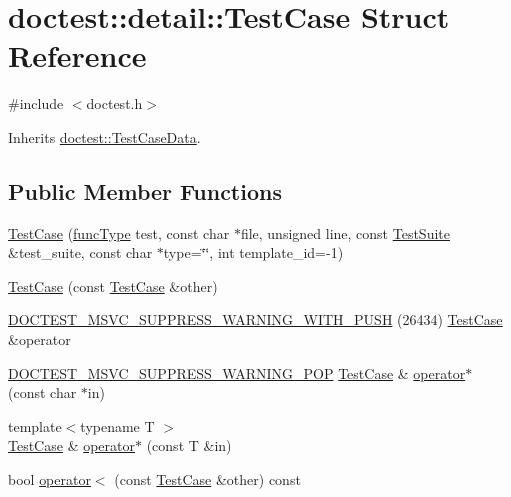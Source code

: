\hypertarget{structdoctest_1_1detail_1_1_test_case}{}\section{doctest\+:\+:detail\+:\+:Test\+Case Struct Reference}
\label{structdoctest_1_1detail_1_1_test_case}


{\ttfamily \#include $<$doctest.\+h$>$}



Inherits \mbox{\hyperlink{structdoctest_1_1_test_case_data}{doctest\+::\+Test\+Case\+Data}}.

\subsection*{Public Member Functions}
\begin{DoxyCompactItemize}
\item 
\mbox{\hyperlink{structdoctest_1_1detail_1_1_test_case_a589d99e8322a4d830d5173545cd3dabe}{Test\+Case}} (\mbox{\hyperlink{namespacedoctest_1_1detail_a7b2c60631c5f4906b26acf2e6b0e6e45}{func\+Type}} test, const char $\ast$file, unsigned line, const \mbox{\hyperlink{structdoctest_1_1detail_1_1_test_suite}{Test\+Suite}} \&test\+\_\+suite, const char $\ast$type=\char`\"{}\char`\"{}, int template\+\_\+id=-\/1)
\item 
\mbox{\hyperlink{structdoctest_1_1detail_1_1_test_case_a0d8aa1f3d0cbd31f3bc4a74d9c6add23}{Test\+Case}} (const \mbox{\hyperlink{structdoctest_1_1detail_1_1_test_case}{Test\+Case}} \&other)
\item 
\mbox{\hyperlink{structdoctest_1_1detail_1_1_test_case_a3e767f89d496f2dc80ebbab72677c754}{D\+O\+C\+T\+E\+S\+T\+\_\+\+M\+S\+V\+C\+\_\+\+S\+U\+P\+P\+R\+E\+S\+S\+\_\+\+W\+A\+R\+N\+I\+N\+G\+\_\+\+W\+I\+T\+H\+\_\+\+P\+U\+SH}} (26434) \mbox{\hyperlink{structdoctest_1_1detail_1_1_test_case}{Test\+Case}} \&operator
\item 
\mbox{\hyperlink{doctest_8h_a540e6314c4b71317f3459f0117e14bc8}{D\+O\+C\+T\+E\+S\+T\+\_\+\+M\+S\+V\+C\+\_\+\+S\+U\+P\+P\+R\+E\+S\+S\+\_\+\+W\+A\+R\+N\+I\+N\+G\+\_\+\+P\+OP}} \mbox{\hyperlink{structdoctest_1_1detail_1_1_test_case}{Test\+Case}} \& \mbox{\hyperlink{structdoctest_1_1detail_1_1_test_case_a2bc7eff3ab5c26149f683f2354463cbd}{operator$\ast$}} (const char $\ast$in)
\item 
{\footnotesize template$<$typename T $>$ }\\\mbox{\hyperlink{structdoctest_1_1detail_1_1_test_case}{Test\+Case}} \& \mbox{\hyperlink{structdoctest_1_1detail_1_1_test_case_a7ff8c8e9a0e4515dbef926a835b447f9}{operator$\ast$}} (const T \&in)
\item 
bool \mbox{\hyperlink{structdoctest_1_1detail_1_1_test_case_a865f5906758263125b68b8d785a05ca1}{operator$<$}} (const \mbox{\hyperlink{structdoctest_1_1detail_1_1_test_case}{Test\+Case}} \&other) const
\end{DoxyCompactItemize}
